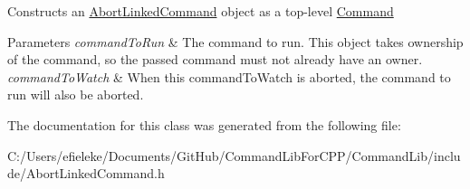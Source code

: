 Constructs an \mbox{\hyperlink{class_command_lib_1_1_abort_linked_command}{Abort\+Linked\+Command}} object as a top-\/level \mbox{\hyperlink{class_command_lib_1_1_command}{Command}} 


\begin{DoxyParams}{Parameters}
{\em command\+To\+Run} & The command to run. This object takes ownership of the command, so the passed command must not already have an owner. \\
\hline
{\em command\+To\+Watch} & When this \textquotesingle{}command\+To\+Watch\textquotesingle{} is aborted, the command to run will also be aborted. \\
\hline
\end{DoxyParams}


The documentation for this class was generated from the following file\+:\begin{DoxyCompactItemize}
\item 
C\+:/\+Users/efieleke/\+Documents/\+Git\+Hub/\+Command\+Lib\+For\+C\+P\+P/\+Command\+Lib/include/Abort\+Linked\+Command.\+h\end{DoxyCompactItemize}
